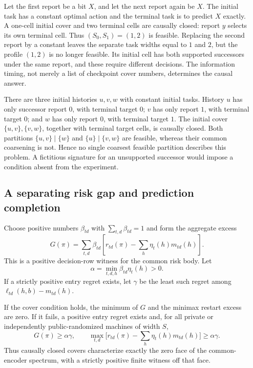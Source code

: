 \begin{example}
\label{ex:v12-support}
Let the first report be a bit $X$, and let the next report again be $X$.
The initial task has a constant optimal action and the terminal task is
to predict $X$ exactly. A one-cell initial cover and two terminal cells
are causally closed: report $y$ selects its own terminal cell. Thus
$(S_0,S_1)=(1,2)$ is feasible. Replacing the second report by a constant
leaves the separate task widths equal to $1$ and $2$, but the profile
$(1,2)$ is no longer feasible. Its initial cell has both supported
successors under the same report, and these require different decisions.
The information timing, not merely a list of checkpoint cover numbers,
determines the causal answer.
\end{example}

\begin{example}
\label{ex:v12-overlap}
There are three initial histories $u,v,w$ with constant initial tasks.
History $u$ has only successor report $0$, with terminal target $0$;
$v$ has only report $1$, with terminal target $0$; and $w$ has only
report $0$, with terminal target $1$. The initial cover
$\{u,v\},\{v,w\}$, together with terminal target cells, is causally
closed. Both partitions $\{u,v\}\mid\{w\}$ and
$\{u\}\mid\{v,w\}$ are feasible, whereas their common coarsening is
not. Hence no single coarsest feasible partition describes this problem.
A fictitious signature for an unsupported successor would impose a
condition absent from the experiment.
\end{example}

\subsection{A separating risk gap and prediction completion}
Choose positive numbers $\beta_{td}$ with $\sum_{t,d}\beta_{td}=1$ and
form the aggregate excess
\[
 G(\pi)=\sum_{t,d}\beta_{td}
       [r_{td}(\pi)-\textstyle\sum_h\eta_t(h)m_{td}(h)].
\]
This is a positive decision-row witness for the common risk body. Let
\[
 \alpha=\min_{t,d,h}\beta_{td}\eta_t(h)>0.
\]
If a strictly positive entry regret exists, let $\gamma$ be the least
such regret among $\ell_{td}(h,b)-m_{td}(h)$.

\begin{corollary}
\label{cor:v12-gap}
If the cover condition holds, the minimum of $G$ and the minimax restart
excess are zero. If it fails, a positive entry regret exists and, for
all private or independently public-randomized machines of width $S$,
\begin{equation}
  G(\pi)\ge\alpha\gamma,
  \qquad
  \max_{t,d}\bigl[r_{td}(\pi)-\textstyle\sum_h\eta_t(h)m_{td}(h)\bigr]
       \ge\alpha\gamma.
 \label{eq:v12-gap}
\end{equation}
Thus causally closed covers characterize exactly the zero face of the
common-encoder spectrum, with a strictly positive finite witness off that
face.
\end{corollary}

